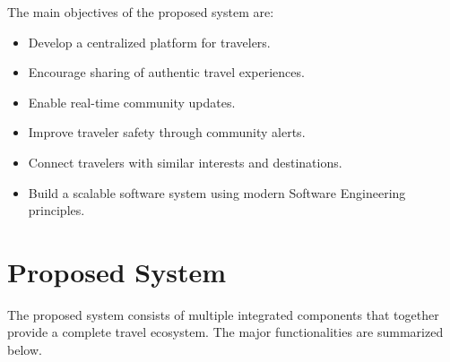 \documentclass[12pt,a4paper]{article}
\begin{document}
The main objectives of the proposed system are:

\begin{itemize}

\item Develop a centralized platform for travelers.

\item Encourage sharing of authentic travel experiences.

\item Enable real-time community updates.

\item Improve traveler safety through community alerts.

\item Connect travelers with similar interests and destinations.

\item Build a scalable software system using modern Software Engineering principles.

\end{itemize}


\section{Proposed System}

The proposed system consists of multiple integrated components that together provide a complete travel ecosystem. The major functionalities are summarized below.
\end{document}

